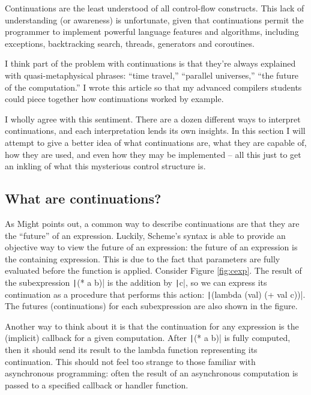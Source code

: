 \documentclass[]{article}
\begin{document}
\begin{displayquote}
  Continuations are the least understood of all control-flow constructs. This lack of understanding (or awareness) is unfortunate, given that continuations permit the programmer to implement powerful language features and algorithms, including exceptions, backtracking search, threads, generators and coroutines.

  I think part of the problem with continuations is that they're always explained with quasi-metaphysical phrases: ``time travel,'' ``parallel universes,'' ``the future of the computation.'' I wrote this article so that my advanced compilers students could piece together how continuations worked by example.
\end{displayquote}

I wholly agree with this sentiment. There are a dozen different ways to interpret continuations, and each interpretation lends its own insights. In this section I will attempt to give a better idea of what continuations are, what they are capable of, how they are used, and even how they may be implemented -- all this just to get an inkling of what this mysterious control structure is.

\subsection{What are continuations?}
\label{sec:what}

As Might points out, a common way to describe continuations are that they are the ``future'' of an expression. Luckily, Scheme's syntax is able to provide an objective way to view the future of an expression: the future of an expression is the containing expression. This is due to the fact that parameters are fully evaluated before the function is applied. Consider Figure \ref{fig:cexp}. The result of the subexpression \texttt|(* a b)| is the addition by \texttt|c|, so we can express its continuation as a procedure that performs this action: \texttt|(lambda (val) (+ val c))|. The futures (continuations) for each subexpression are also shown in the figure.

Another way to think about it is that the continuation for any expression is the (implicit) callback for a given computation. After \texttt|(* a b)| is fully computed, then it should send its result to the lambda function representing its continuation. This should not feel too strange to those familiar with asynchronous programming: often the result of an asynchronous computation is passed to a specified callback or handler function.
\end{document}
